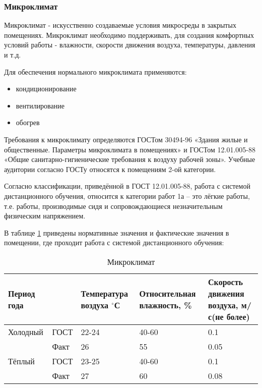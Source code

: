 \subsubsection{Микроклимат}

Микроклимат - искусственно создаваемые условия микросреды в зак\-рытых помещениях.
Микроклимат необходимо поддерживать, для создания комфорт\-ных условий работы - влажности, скорости движения воздуха, тем\-пературы, давления и т.д.

Для обеспечения нормального микроклимата применяются:

\begin{itemize}
\item кондиционирование
\item вентилирование
\item обогрев
\end{itemize}

Требования к микроклимату определяются ГОСТом 30494-96 «Здания жи\-лые и общест\-венные. Параметры микроклимата в помещениях»  и ГОСТом 12.01.005-88 «Общие санитарно-гигиенические требования к воздуху рабочей зоны». Учебные аудито\-рии согласно ГОСТу относятся к помещениям 2-ой категории.

Согласно классификации, приведённой в ГОСТ 12.01.005-88, работа с сис\-темой дистан\-ционного обучения, относится к категории работ 1а – это лёгкие работы, т.е. работы, производимые сидя и сопровождающиеся незначитель\-ным физическим напряжением.

В таблице \ref{microclimat} приведены нормативные значения и фактические значения в помещении, где проходит работа с сис\-темой дистанционного обучения:

\begin{table}[H]
\caption{Микроклимат\label{microclimat}}
\begin{center}
\begin{tabular}{|l|p{}|p{2.7cm}|p{3.2cm}|p{3cm}|}
\hline
Период года &  & Температура воздуха $^\circ$С & Относительная влажность, \% & Скорость движения воздуха, м/с(не более)\\
\hline
Холодный & ГОСТ & 22-24 & 40-60 & 0.1\\
 & Факт & 26 & 55 & 0.05\\
\hline
Тёплый & ГОСТ & 23-25 & 40-60 & 0.1\\
 & Факт & 27 & 60 & 0.08\\
\hline
\end{tabular}
\end{center}
\end{table}

